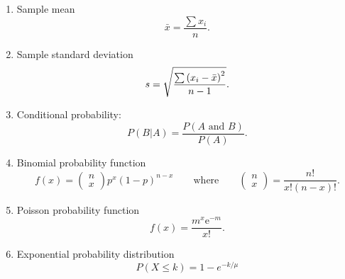 \documentclass[a4paper,12pt]{article}
\begin{document}
\begin{enumerate}
\item Sample mean
\begin{equation*}
\bar{x}=\frac{\sum x_{i}}{n}.
\end{equation*}

\item Sample standard deviation
\begin{equation*}
s=\sqrt{\frac{\sum \left( x_{i}-\bar{x}\right) ^{2}}{%
n-1}}.
\end{equation*}

\item Conditional probability:
\begin{equation*}
P(B|A)=\frac{P\left( A\text{ and }B\right) }{P\left( A\right) }.
\end{equation*}

\item Binomial probability function
\begin{equation*}
f\left( x\right) =\left(
\begin{array}{c}
n \\
x%
\end{array}%
\right) p^{x}\left( 1-p\right) ^{n-x}\qquad \text{where}\qquad \left(
\begin{array}{c}
n \\
x%
\end{array}%
\right) =\frac{n!}{x!\left( n-x\right) !}.
\end{equation*}

\item Poisson probability function
\begin{equation*}
f\left( x\right) =\frac{m^{x}\mathrm{e}^{-m}}{x!}.
\end{equation*}

\item Exponential probability distribution
\begin{equation*}
P\left( X \leq k \right) = 1 - e^{-k/\mu}
\end{equation*}


\end{enumerate}
\end{document}
